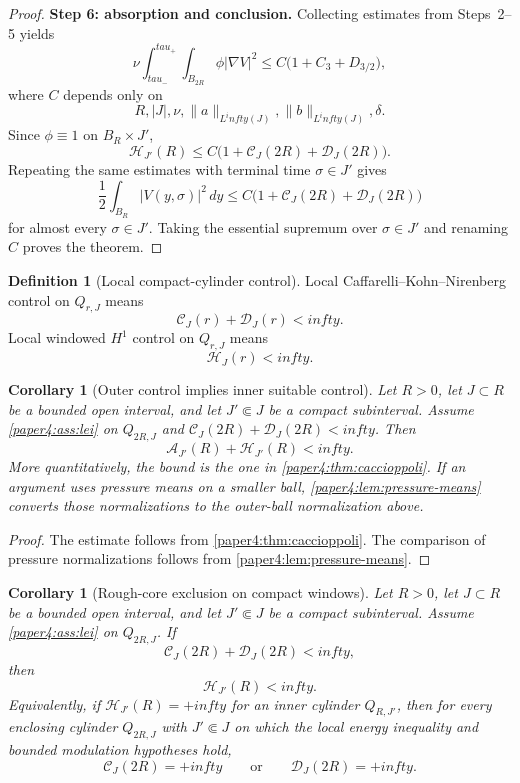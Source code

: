 \documentclass[11pt]{amsart}
\def\mathbb#1{#1}%
\def\tau{tau}%
\def\infty{infty}%
\theoremstyle{plain}
\newtheorem{corollary}[theorem]{Corollary}
\theoremstyle{definition}
\newtheorem{definition}[theorem]{Definition}
\theoremstyle{remark}
\begin{document}
\begin{proof}
\textbf{Step 6: absorption and conclusion.}
Collecting estimates from Steps~2--5 yields
\[
\nu\int_{\tau_-}^{\tau_+}\!\int_{B_{2R}}\phi|\nabla V|^2
\le C\bigl(1+C_3+D_{3/2}\bigr),
\]
where $C$ depends only on
\[
R,|J|,\nu,\|a\|_{L^\infty(J)},\|b\|_{L^\infty(J)},\delta.
\]
Since $\phi\equiv1$ on $B_R\times J'$,
\[
\mathcal H_{J'}(R)
\le C\bigl(1+\mathcal C_J(2R)+\mathcal D_J(2R)\bigr).
\]
Repeating the same estimates with terminal time $\sigma\in J'$ gives
\[
\frac12\int_{B_R}|V(y,\sigma)|^2\,dy
\le C\bigl(1+\mathcal C_J(2R)+\mathcal D_J(2R)\bigr)
\]
for almost every $\sigma\in J'$. Taking the essential supremum over
$\sigma\in J'$ and renaming $C$ proves the theorem.
\end{proof}

\begin{definition}[Local compact-cylinder control]
Local Caffarelli--Kohn--Nirenberg control on $Q_{r,J}$ means
\[
\mathcal C_J(r)+\mathcal D_J(r)<\infty.
\]
Local windowed $H^1$ control on $Q_{r,J}$ means
\[
\mathcal H_J(r)<\infty.
\]
\end{definition}

\begin{corollary}[Outer control implies inner suitable control]\label{paper4:cor:outer-inner}
Let $R>0$, let $J\subset\mathbb R$ be a bounded open interval, and let
$J'\Subset J$ be a compact subinterval. Assume \cref{paper4:ass:lei} on $Q_{2R,J}$ and
$\mathcal C_J(2R)+\mathcal D_J(2R)<\infty$. Then
\[
\mathcal A_{J'}(R)+\mathcal H_{J'}(R)<\infty.
\]
More quantitatively, the bound is the one in \cref{paper4:thm:caccioppoli}. If an
argument uses pressure means on a smaller ball, \cref{paper4:lem:pressure-means}
converts those normalizations to the outer-ball normalization above.
\end{corollary}

\begin{proof}
The estimate follows from \cref{paper4:thm:caccioppoli}. The comparison of pressure normalizations follows from
\cref{paper4:lem:pressure-means}.
\end{proof}

\begin{corollary}[Rough-core exclusion on compact windows]\label{paper4:cor:rough-core}
Let $R>0$, let $J\subset\mathbb R$ be a bounded open interval, and let
$J'\Subset J$ be a compact subinterval. Assume \cref{paper4:ass:lei} on $Q_{2R,J}$. If
\[
\mathcal C_J(2R)+\mathcal D_J(2R)<\infty,
\]
then
\[
\mathcal H_{J'}(R)<\infty.
\]
Equivalently, if $\mathcal H_{J'}(R)=+\infty$ for an inner cylinder
$Q_{R,J'}$, then for every enclosing cylinder $Q_{2R,J}$ with
$J'\Subset J$ on which the local energy inequality and bounded
modulation hypotheses hold,
\[
\mathcal C_J(2R)=+\infty
\qquad\text{or}\qquad
\mathcal D_J(2R)=+\infty.
\]
\end{corollary}
\end{document}
